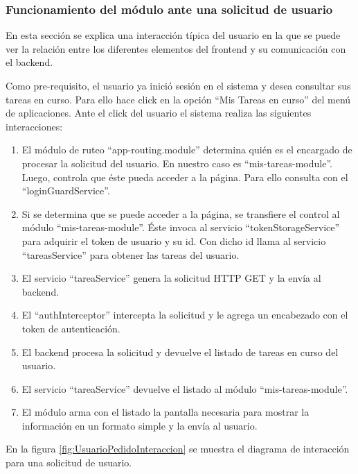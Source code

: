 \pagebreak
\subsubsection{Funcionamiento del módulo ante una solicitud de usuario}

En esta sección se explica una interacción típica del usuario en la que se puede ver la relación entre los diferentes elementos del frontend y su comunicación con el backend.

Como pre-requisito, el usuario ya inició sesión en el sistema y desea consultar sus tareas en curso. Para ello hace click en la opción ``Mis Tareas en curso'' del menú de aplicaciones. Ante el click del usuario el sistema realiza las siguientes interacciones:

\begin{enumerate}
\item El módulo de ruteo ``app-routing.module'' determina quién es el encargado de procesar la solicitud del usuario. En nuestro caso es ``mis-tareas-module''. Luego, controla que éste pueda acceder a la página. Para ello consulta con el ``loginGuardService''.
\item Si se determina que se puede acceder a la página, se transfiere el control al módulo ``mis-tareas-module''. Éste invoca al servicio ``tokenStorageService'' para adquirir el token de usuario y su id. Con dicho id llama al servicio ``tareasService'' para obtener las tareas del usuario.
\item El servicio ``tareaService'' genera la solicitud HTTP GET y la envía al backend.
\item El ``authInterceptor'' intercepta la solicitud y le agrega un encabezado con el token de autenticación.
\item El backend procesa la solicitud y devuelve el listado de tareas en curso del usuario.
\item El servicio ``tareaService'' devuelve el listado al módulo ``mis-tareas-module''.
\item El módulo arma con el listado la pantalla necesaria para mostrar la información en un formato simple y la envía al usuario.
\end{enumerate}

En la figura \ref{fig:UsuarioPedidoInteraccion} se muestra el diagrama de interacción para una solicitud de usuario.

